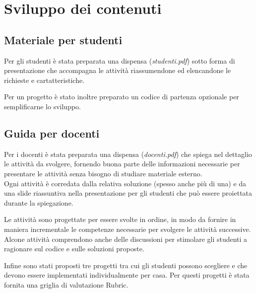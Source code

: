 \documentclass[../../relazione.tex]{subfiles}
\begin{document}
\section{Sviluppo dei contenuti}

\subsection{Materiale per studenti}
Per gli studenti è stata preparata una dispensa (\textit{studenti.pdf}) sotto forma di presentazione che accompagna le attività riassumendone ed elencandone le richieste e cartatteristiche.

Per un progetto è stato inoltre preparato un codice di partenza opzionale per semplificarne lo sviluppo.

\subsection{Guida per docenti}
Per i docenti è stata preparata una dispensa (\textit{docenti.pdf}) che spiega nel dettaglio le attività da svolgere, fornendo buona parte delle informazioni necessarie per presentare le attività senza bisogno di studiare materiale esterno.\\
Ogni attività è corredata dalla relativa soluzione (spesso anche più di una) e da una slide riassuntiva nella presentazione per gli studenti che può essere proiettata durante la spiegazione.

Le attività sono progettate per essere svolte in ordine, in modo da fornire in maniera incrementale le competenze necessarie per svolgere le attività successive. Alcone attività comprendono anche delle discussioni per stimolare gli studenti a ragionare sul codice e sulle soluzioni proposte.

Infine sono stati proposti tre progetti tra cui gli studenti possono scegliere e che devono essere implementati individualmente per casa. Per questi progetti è stata fornita una griglia di valutazione Rubric.
\end{document}
